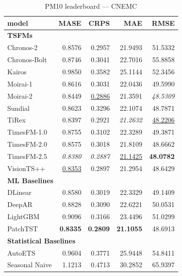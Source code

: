 \begin{table}[H]
\caption{PM10 leaderboard --- CNEMC}
\centering
\begin{small}
\begin{tabular}{lrrrr}
\toprule
model & MASE & CRPS & MAE & RMSE \\
\midrule
\multicolumn{5}{l}{\textbf{TSFMs}} \\
Chronos-2 & 0.8576 & 0.2957 & 21.9493 & 51.5332 \\
Chronos-Bolt & 0.8746 & 0.3041 & 22.7016 & 55.8858 \\
Kairos & 0.9850 & 0.3582 & 25.1144 & 52.3456 \\
Moirai-1 & 0.8616 & 0.3031 & 22.0436 & 49.5990 \\
Moirai-2 & 0.8449 & \underline{0.2886} & 21.3591 & \textit{48.5309} \\
Sundial & 0.8623 & 0.3296 & 22.1074 & 48.7871 \\
TiRex & 0.8397 & 0.2921 & \textit{21.2632} & \underline{48.2206} \\
TimesFM-1.0 & 0.8755 & 0.3102 & 22.3289 & 49.3871 \\
TimesFM-2.0 & 0.8575 & 0.3018 & 21.8109 & 48.6662 \\
TimesFM-2.5 & \textit{0.8380} & \textit{0.2887} & \underline{21.1425} & \textbf{48.0782} \\
VisionTS++ & \underline{0.8353} & 0.2897 & 21.2954 & 48.6429 \\
\midrule
\multicolumn{5}{l}{\textbf{ML Baselines}} \\
DLinear & 0.8580 & 0.3019 & 22.3329 & 49.1409 \\
DeepAR & 0.8828 & 0.3090 & 22.6221 & 50.0531 \\
LightGBM & 0.9096 & 0.3166 & 23.4496 & 51.0299 \\
PatchTST & \textbf{0.8335} & \textbf{0.2809} & \textbf{21.1055} & 48.6913 \\
\midrule
\multicolumn{5}{l}{\textbf{Statistical Baselines}} \\
AutoETS & 0.9604 & 0.3771 & 25.9448 & 54.8411 \\
Seasonal Naive & 1.1213 & 0.4713 & 30.2852 & 65.9397 \\
\bottomrule
\end{tabular}
\end{small}
\end{table}